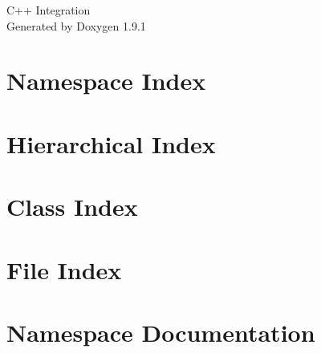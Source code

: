 \let\mypdfximage\pdfximage\def\pdfximage{\immediate\mypdfximage}\documentclass[twoside]{book}
\newcommand{\+}{\discretionary{\mbox{\scriptsize$\hookleftarrow$}}{}{}}
\newcommand{\clearemptydoublepage}{%
  \newpage{\pagestyle{empty}\cleardoublepage}%
}
\begin{document}
\raggedbottom

\hypersetup{pageanchor=false,
             bookmarksnumbered=true,
             pdfencoding=unicode
            }
\begin{titlepage}
\vspace*{7cm}
\begin{center}%
{\Large C++ Integration }\\
\vspace*{1cm}
{\large Generated by Doxygen 1.9.1}\\
\end{center}
\end{titlepage}
\clearemptydoublepage
{}
\tableofcontents
\clearemptydoublepage
{}
\hypersetup{pageanchor=true}

\chapter{Namespace Index}

\chapter{Hierarchical Index}

\chapter{Class Index}

\chapter{File Index}

\chapter{Namespace Documentation}


\end{document}
